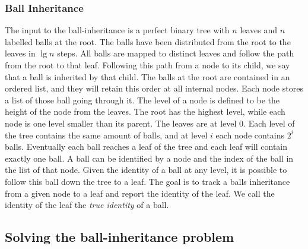 

\subsubsection{Ball Inheritance}
The input to the ball-inheritance is a perfect binary tree with $n$ leaves and $n$ labelled balls at the root. The balls have been distributed from the root to the leaves in $\lg n$ steps. All balls are mapped to distinct leaves and follow the path from the root to that leaf. Following this path from a node to its child, we say that a ball is inherited by that child. The balls at the root are contained in an ordered list, and they will retain this order at all internal nodes. Each node stores a list of those ball going through it. The level of a node is defined to be the height of the node from the leaves. The root has the highest level, while each node is one level smaller than its parent. The leaves are at level $0$. Each level of the tree contains the same amount of balls, and at level $i$ each node contains $2^i$ balls. Eventually each ball reaches a leaf of the tree and each leaf will contain exactly one ball. A ball can be identified by a node and the index of the ball in the list of that node. Given the identity of a ball at any level, it is possible to follow this ball down the tree to a leaf. The goal is to track a balls inheritance from a given node to a leaf and report the identity of the leaf. We call the identity of the leaf the \emph{true identity} of a ball. 

\subsection{Solving the ball-inheritance problem} 
\label{ssection:solving-ball}

